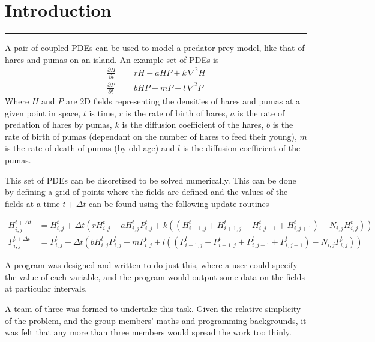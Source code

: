 \section{Introduction}
\vspace{-2em}\rule{\textwidth}{1pt}\vspace{1em}

A pair of coupled PDEs can be used to model a predator prey model, like
that of hares and pumas on an island.
An example set of PDEs is
\begin{align*}
  \frac{\partial{H}}{\partial{t}} &= rH - aHP + k\,{\nabla^2}H \\
  \frac{\partial{P}}{\partial{t}} &= bHP - mP + l\,{\nabla^2}P
\end{align*}
Where $H$ and $P$ are 2D fields representing the densities of hares and pumas
at a given point in space,
$t$ is time,
$r$ is the rate of birth of hares,
$a$ is the rate of predation of hares by pumas,
$k$ is the diffusion coefficient of the hares,
$b$ is the rate of birth of pumas (dependant on the number of hares to
    feed their young),
$m$ is the rate of death of pumas (by old age) and
$l$ is the diffusion coefficient of the pumas.

This set of PDEs can be discretized to be solved numerically.
This can be done by defining a grid of points where the fields are
defined and the values of the fields at a time $t + \Delta{t}$ can
be found using the following update routines

\begin{align*}
  H^{t+\Delta{t}}_{i,j} &= H^{t}_{i,j}
       + \Delta{t}(
           rH^{t}_{i,j} - a H^{t}_{i,j} P^{t}_{i,j}
           + k (
             (H^{t}_{i-1,j} + H^{t}_{i+1,j} + H^{t}_{i,j-1} + H^{t}_{i,j+1})
             -N_{i,j} H^{t}_{i,j}
           )
         ) \\
%
  P^{t+\Delta{t}}_{i,j} &= P^{t}_{i,j}
       + \Delta{t}(
           b H^{t}_{i,j} P^{t}_{i,j} - mP^{t}_{i,j}
           + l (
             (P^{t}_{i-1,j} + P^{t}_{i+1,j} + P^{t}_{i,j-1} + P^{t}_{i,j+1})
             -N_{i,j} P^{t}_{i,j}
           )
         )
\end{align*}

A program was designed and written to do just this, where a user could
specify the value of each variable, and the program would output some
data on the fields at particular intervals.

A team of three was formed to undertake this task.
Given the relative simplicity of the problem, and the group members'
maths and programming backgrounds, it was felt that any more than three
members would spread the work too thinly.
